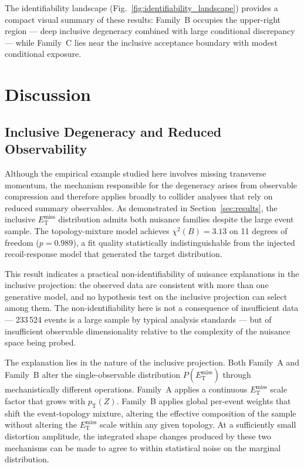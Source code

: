 \documentclass[a4paper,11pt]{article}
\newcommand{\MET}{\ensuremath{E_{\mathrm{T}}^{\mathrm{miss}}}\xspace}
\newcommand{\pTZ}{\ensuremath{p_{\mathrm{T}}(Z)}\xspace}
\begin{document}
The identifiability landscape (Fig.~\ref{fig:identifiability_landscape})
provides a compact visual summary of these results: Family~B occupies the
upper-right region --- deep inclusive degeneracy combined with large
conditional discrepancy --- while Family~C lies near the inclusive
acceptance boundary with modest conditional exposure.

\section{Discussion}
\label{sec:discussion}

\subsection{Inclusive Degeneracy and Reduced Observability}

Although the empirical example studied here involves missing transverse
momentum, the mechanism responsible for the degeneracy arises from
observable compression and therefore applies broadly to collider analyses
that rely on reduced summary observables.
As demonstrated in Section~\ref{sec:results}, the inclusive \MET
distribution admits both nuisance families despite the large event sample.
The topology-mixture model achieves $\chi^2(B) = 3.13$ on 11 degrees of
freedom ($p = 0.989$), a fit quality statistically indistinguishable from
the injected recoil-response model that generated the target distribution.

This result indicates a practical non-identifiability of nuisance
explanations in the inclusive projection: the observed data are consistent
with more than one generative model, and no hypothesis test on the inclusive
projection can select among them.
The non-identifiability here is not a consequence of insufficient data ---
233\,524 events is a large sample by typical analysis standards --- but of
insufficient observable dimensionality relative to the complexity of the
nuisance space being probed.

The explanation lies in the nature of the inclusive projection.
Both Family~A and Family~B alter the single-observable distribution
$P(\MET)$ through mechanistically different operations.
Family~A applies a continuous \MET scale factor that grows with \pTZ.
Family~B applies global per-event weights that shift the event-topology
mixture, altering the effective composition of the sample without altering
the \MET scale within any given topology.
At a sufficiently small distortion amplitude, the integrated shape changes
produced by these two mechanisms can be made to agree to within statistical
noise on the marginal distribution.
\end{document}
